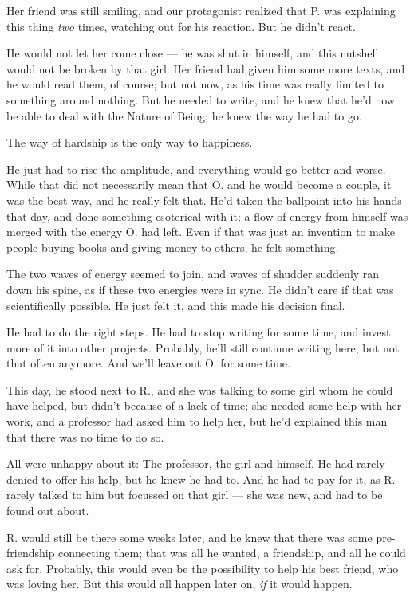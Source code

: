 Her friend was still smiling, and our protagonist realized that P. was explaining this thing \emph{two} times, watching out for his reaction. 
But he didn't react.

He would not let her come close --- he was shut in himself, and this nutshell would not be broken by that girl. 
Her friend had given him some more texts, and he would read them, of course; but not now, as his time was really limited to something around nothing. 
But he needed to write, and he knew that he'd now be able to deal with the Nature of Being; he knew the way he had to go. 

The way of hardship is the only way to happiness.

He just had to rise the amplitude, and everything would go better and worse. While that did not necessarily mean that O. and he would become a couple, it was the best way, and he really felt that. 
He'd taken the ballpoint into his hands that day, and done something esoterical with it; a flow of energy from himself was merged with the energy O. had left. Even if that was just an invention to make people buying books and giving money to others, he felt something.

The two waves of energy seemed to join, and waves of shudder suddenly ran down his spine, as if these two energies were in sync. He didn't care if that was scientifically possible. He just felt it, and this made his decision final.

He had to do the right steps. 
He had to stop writing for some time, and invest more of it into other projects. Probably, he'll still continue writing here, but not that often anymore. 
And we'll leave out O. for some time.

This day, he stood next to R., and she was talking to some girl whom he could have helped, but didn't because of a lack of time; she needed some help with her work, and a professor had asked him to help her, but he'd explained this man that there was no time to do so.

All were unhappy about it: The professor, the girl and himself. He had rarely denied to offer his help, but he knew he had to. 
And he had to pay for it, as R. rarely talked to him but focussed on that girl --- she was new, and had to be found out about.

R. would still be there some weeks later, and he knew that there was some pre-friendship connecting them; that was all he wanted, a friendship, and all he could ask for. Probably, this would even be the possibility to help his best friend, who was loving her.
But this would all happen later on, \emph{if} it would happen.

